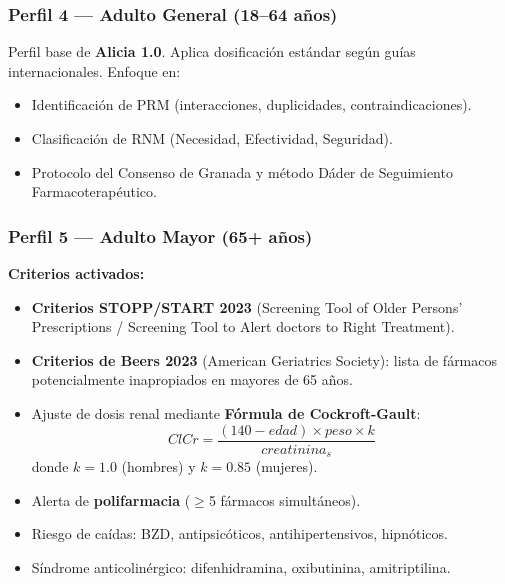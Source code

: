 \documentclass[12pt,a4paper]{article}
\begin{document}
\subsubsection{Perfil 4 --- Adulto General (18--64 años)}

\begin{tcolorbox}[colback=adulto!5, colframe=adulto, title=\textbf{Adulto General --- 18-64 años}]
  Perfil base de \textbf{Alicia 1.0}. Aplica dosificación estándar según guías internacionales.
  Enfoque en:
  \begin{itemize}
    \item Identificación de PRM (interacciones, duplicidades, contraindicaciones).
    \item Clasificación de RNM (Necesidad, Efectividad, Seguridad).
    \item Protocolo del Consenso de Granada y método Dáder de Seguimiento
      Farmacoterapéutico.
  \end{itemize}
\end{tcolorbox}

\subsubsection{Perfil 5 --- Adulto Mayor (65+ años)}

\begin{tcolorbox}[colback=geriatrico!5, colframe=geriatrico, title=\textbf{Adulto Mayor --- 65+ años}]
  \textbf{Criterios activados:}
  \begin{itemize}
    \item \textbf{Criterios STOPP/START 2023} (Screening Tool of Older Persons' Prescriptions /
      Screening Tool to Alert doctors to Right Treatment).
    \item \textbf{Criterios de Beers 2023} (American Geriatrics Society): lista de fármacos
      potencialmente inapropiados en mayores de 65 años.
    \item Ajuste de dosis renal mediante \textbf{Fórmula de Cockroft-Gault}:
      $$ ClCr = \frac{(140-edad) \times peso \times k}{creatinina_s} $$
      donde $k = 1.0$ (hombres) y $k = 0.85$ (mujeres).
    \item Alerta de \textbf{polifarmacia} ($\geq$5 fármacos simultáneos).
    \item Riesgo de caídas: BZD, antipsicóticos, antihipertensivos, hipnóticos.
    \item Síndrome anticolinérgico: difenhidramina, oxibutinina, amitriptilina.
  \end{itemize}
\end{tcolorbox}
\end{document}
